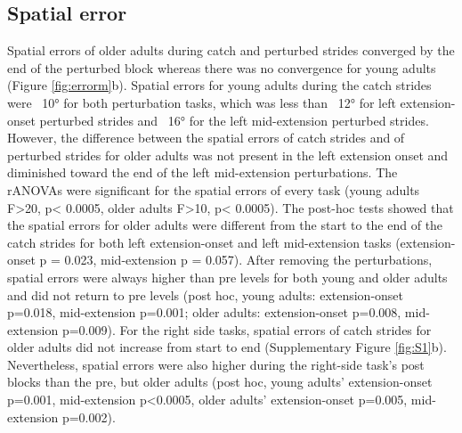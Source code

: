 \documentclass[../thesis_seyed.tex]{subfiles}
\begin{document}
\subsection{Spatial error}
Spatial errors of older adults during catch and perturbed strides converged by the end of the perturbed block whereas there was no convergence for young adults (Figure \ref{fig:errorm}b). Spatial errors for young adults during the catch strides were ~10° for both perturbation tasks, which was less than ~12° for left extension-onset perturbed strides and ~16° for the left mid-extension perturbed strides. However, the difference between the spatial errors of catch strides and of perturbed strides for older adults was not present in the left extension onset and diminished toward the end of the left mid-extension perturbations. The rANOVAs were significant for the spatial errors of every task (young adults F>20, p< 0.0005, older adults F>10, p< 0.0005). The post-hoc tests showed that the spatial errors for older adults were different from the start to the end of the catch strides for both left extension-onset and left mid-extension tasks (extension-onset p = 0.023, mid-extension p = 0.057).  After removing the perturbations, spatial errors were always higher than pre levels for both young and older adults and did not return to pre levels (post hoc, young adults: extension-onset p=0.018, mid-extension p=0.001; older adults: extension-onset p=0.008, mid-extension p=0.009). For the right side tasks, spatial errors of catch strides for older adults did not increase from start to end (Supplementary Figure \ref{fig:S1}b). Nevertheless, spatial errors were also higher during the right-side task’s post blocks than the pre, but older adults (post hoc, young adults' extension-onset p=0.001, mid-extension p<0.0005, older adults' extension-onset p=0.005, mid-extension p=0.002).
\end{document}
